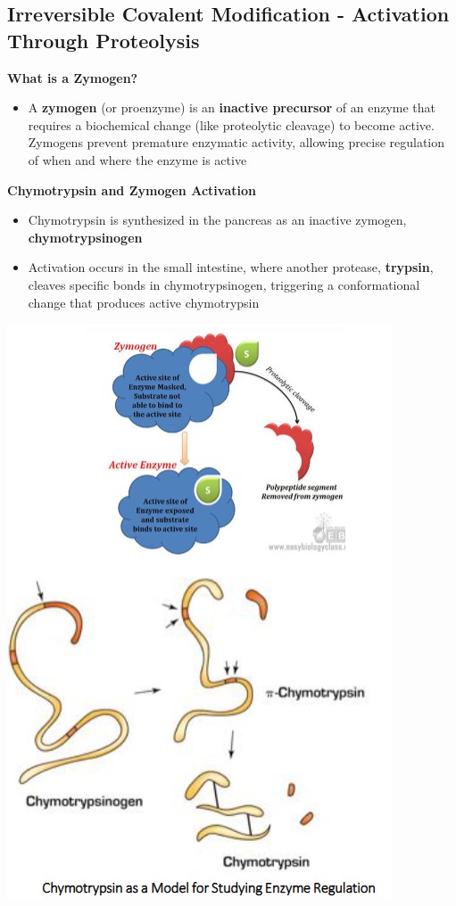 \documentclass[10pt]{article}
\begin{document}
\subsection*{Irreversible Covalent Modification - Activation Through Proteolysis}
\textbf{What is a Zymogen?}
\begin{itemize}
	\item A \textbf{zymogen} (or proenzyme) is an \textbf{inactive precursor} of an enzyme that requires a biochemical change (like proteolytic cleavage) to become active.  Zymogens prevent premature enzymatic activity, allowing precise regulation of when and where the enzyme is active
\end{itemize}
\textbf{Chymotrypsin and Zymogen Activation}
\begin{itemize}
	\item Chymotrypsin is synthesized in the pancreas as an inactive zymogen, \textbf{chymotrypsinogen}
	\item Activation occurs in the small intestine, where another protease, \textbf{trypsin}, cleaves specific bonds in chymotrypsinogen, triggering a conformational change that produces active chymotrypsin
\end{itemize}
\begin{center} 
	\includegraphics*[scale=0.8]{L1_9.png}
\end{center}
\end{document}
